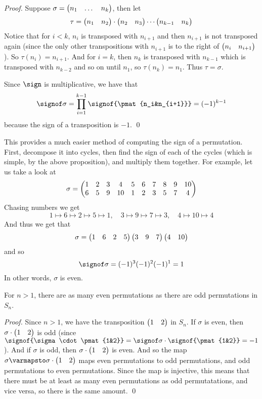 \begin{proof}

    Suppose $\sigma=\begin{pmatrix}n_1&\dots&n_k\end{pmatrix}$, then let
    \[ \tau = \begin{pmatrix}n_1&n_2\end{pmatrix}\cdot\begin{pmatrix}n_2&n_3\end{pmatrix}\cdots\begin{pmatrix}n_{k-1}&n_k\end{pmatrix} \]
    Notice that for $i<k$, $n_i$ is transposed with $n_{i+1}$ and then $n_{i+1}$ is not transposed again (since the only other transpositions with $n_{i+1}$ is to the right of $\begin{pmatrix}n_i&n_{i+1}\end{pmatrix}$).
    So $\tau(n_i)=n_{i+1}$.
    And for $i=k$, then $n_k$ is transposed with $n_{k-1}$ which is transposed with $n_{k-2}$ and so on until $n_1$, so $\tau(n_k)=n_1$.
    Thus $\tau=\sigma$.

    Since $\sign$ is multiplicative, we have that
    \[ \signof\sigma = \prod_{i=1}^{k-1}\signof{\pmat{n_i&n_{i+1}}} = (-1)^{k-1} \]
    because the sign of a transposition is $-1$.
    \qed

\end{proof}

This provides a much easier method of computing the sign of a permutation.
First, decompose it into cycles, then find the sign of each of the cycles (which is simple, by the above proposition), and multiply them together.
For example, let us take a look at
\[ \sigma = \begin{pmatrix}1&2&3&4&5&6&7&8&9&10\\6&5&9&10&1&2&3&5&7&4\end{pmatrix} \]
Chasing numbers we get
\[ 1\mapsto6\mapsto2\mapsto5\mapsto1,\quad 3\mapsto9\mapsto7\mapsto3,\quad 4\mapsto10\mapsto4 \]
And thus we get that
\[ \sigma=\begin{pmatrix}1&6&2&5\end{pmatrix}\begin{pmatrix}3&9&7\end{pmatrix}\begin{pmatrix}4&10\end{pmatrix} \]
and so
\[ \signof\sigma=(-1)^3(-1)^2(-1)^1=1 \]
In other words, $\sigma$ is even.

\begin{prop*}

    For $n>1$, there are as many even permutations as there are odd permutations in $S_n$.

\end{prop*}

\begin{proof}

    Since $n>1$, we have the transposition $\begin{pmatrix}1&2\end{pmatrix}$ in $S_n$.
    If $\sigma$ is even, then $\sigma\cdot\begin{pmatrix}1&2\end{pmatrix}$ is odd (since $\signof{\sigma\cdot\pmat{1&2}}=\signof\sigma\cdot\signof{\pmat{1&2}}=-1$).
    And if $\sigma$ is odd, then $\sigma\cdot\begin{pmatrix}1&2\end{pmatrix}$ is even.
    And so the map $\sigma\varmapsto\sigma\cdot\pmat{1&2}$ maps even permutations to odd permutations, and odd permutations to even permutations.
    Since the map is injective, this means that there must be at least as many even permutations as odd permutatations, and vice versa, so there is the same amount.
    \qed

\end{proof}


